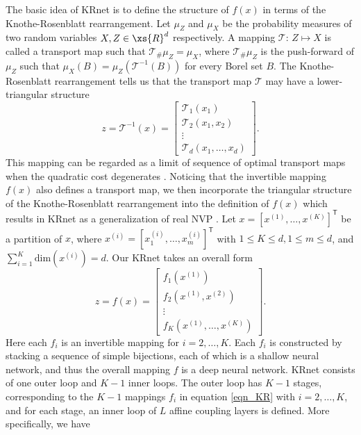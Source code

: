 The basic idea of KRnet is to define the structure of $f({x})$ in terms of the Knothe-Rosenblatt rearrangement. Let $\mu_Z$ and $\mu_X$ be the probability measures of two random variables $X,Z\in\xs{R}^d$ respectively. A mapping $\mathcal{T}$: $Z \mapsto X$ is called a transport map such that $\mathcal{T}_{\#} \mu_Z = \mu_X$, where $\mathcal{T}_{\#} \mu_{Z}$ is the push-forward of $\mu_{Z}$ such that $\mu_{X}(B) = \mu_{Z}(\mathcal{T}^{-1}(B))$ for every Borel set $B$. The Knothe-Rosenblatt rearrangement tells us that the transport map $\mathcal{T}$ may have a lower-triangular structure 
\begin{equation}
    {z} = \mathcal{T}^{-1}({x}) = \left[ 
    \begin{array}{l}
    \mathcal{T}_1(x_1) \\
    \mathcal{T}_2(x_1, x_2) \\
    \vdots \\
    \mathcal{T}_{d}(x_1, \ldots, x_d)
    \end{array}
    \right].
\end{equation}
This mapping can be regarded as a limit of sequence of optimal transport maps when the quadratic cost degenerates \cite{carlier2010knothe}. Noticing that the invertible mapping $f(x)$ also defines a transport map, we then incorporate the triangular structure of the Knothe-Rosenblatt rearrangement into the definition of $f(x)$ which results in KRnet as a generalization of real NVP \cite{dinh2016density}. Let ${x} = [{x}^{(1)}, \ldots, {x}^{(K)}]^\mathsf{T}$ be a partition of ${x}$, where ${x}^{(i)} = [x_{1}^{(i)}, \ldots, x_{m}^{(i)}]^\mathsf{T}$ with $1 \leq K \leq d, 1 \leq m \leq d$, and $\sum_{i=1}^K \mathrm{dim}({x}^{(i)}) = d$. Our KRnet takes an overall form
\begin{equation} \label{eqn_KR}
  {z} = f({x}) = \left[ 
    \begin{array}{l}
    f_1({x}^{(1)}) \\
    f_2({x}^{(1)}, {x}^{(2)}) \\
    \vdots \\
    f_{K}({x}^{(1)}, \ldots, {x}^{(K)})
    \end{array}
    \right].
\end{equation}
Here each $f_{i}$ is an invertible mapping  for $ i = 2, \ldots, K$. Each $f_{i}$ is constructed by stacking a sequence of simple bijections, each of which is a shallow neural network, and thus the overall mapping $f$ is a deep neural network. KRnet consists of one  outer loop and $K-1$ inner loops. The outer loop has $K-1$ stages, corresponding to the $K-1$ mappings $f_{i}$ in equation \eqref{eqn_KR} with $i=2,\ldots,K$, and for each stage, an inner loop of $L$ affine coupling layers is defined. More specifically, we have
